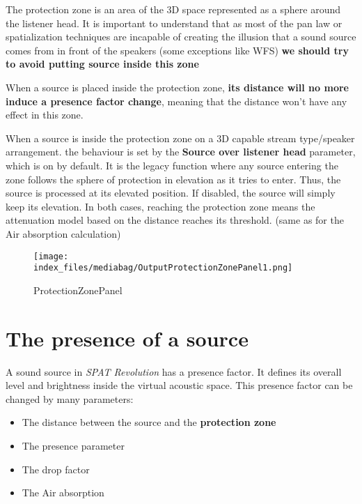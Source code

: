 \documentclass[
  letterpaper,
  DIV=11,
  numbers=noendperiod]{scrreport}
\providecommand{\tightlist}{%
  \setlength{\itemsep}{0pt}\setlength{\parskip}{0pt}}\usepackage{longtable,booktabs,array}
\begin{document}
The protection zone is an area of the 3D space represented as a sphere
around the listener head. It is important to understand that as most of
the pan law or spatialization techniques are incapable of creating the
illusion that a sound source comes from in front of the speakers (some
exceptions like WFS) \textbf{we should try to avoid putting source
inside this zone}

When a source is placed inside the protection zone, \textbf{its distance
will no more induce a presence factor change}, meaning that the distance
won't have any effect in this zone.

When a source is inside the protection zone on a 3D capable stream
type/speaker arrangement. the behaviour is set by the \textbf{Source
over listener head} parameter, which is on by default. It is the legacy
function where any source entering the zone follows the sphere of
protection in elevation as it tries to enter. Thus, the source is
processed at its elevated position. If disabled, the source will simply
keep its elevation. In both cases, reaching the protection zone means
the attenuation model based on the distance reaches its threshold. (same
as for the Air absorption calculation)

\begin{figure}

{\centering \texttt{[image: index\_files/mediabag/OutputProtectionZonePanel1.png]}

}

\caption{ProtectionZonePanel}

\end{figure}

\hypertarget{the-presence-of-a-source}{%
\section{The presence of a source}\label{the-presence-of-a-source}}

A sound source in \emph{SPAT Revolution} has a presence factor. It
defines its overall level and brightness inside the virtual acoustic
space. This presence factor can be changed by many parameters:

\begin{itemize}
\tightlist
\item
  The distance between the source and the \textbf{protection zone}
\item
  The presence parameter
\item
  The drop factor
\item
  The Air absorption
\end{itemize}
\end{document}
